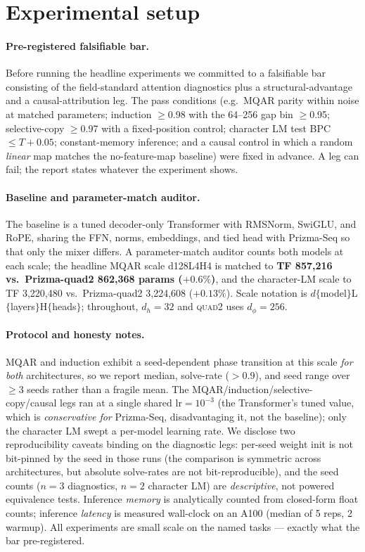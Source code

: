 \documentclass[11pt]{article}
\newcommand{\dphi}{d_{\phi}}
\newcommand{\dhd}{d_{h}}
\newcommand{\quadtwo}{\textsc{quad2}}
\begin{document}
\section{Experimental setup}
\label{sec:setup}

\paragraph{Pre-registered falsifiable bar.}
Before running the headline experiments we committed to a falsifiable bar consisting of the
field-standard attention diagnostics plus a structural-advantage and a causal-attribution leg. The
pass conditions (e.g.\ MQAR parity within noise at matched parameters; induction $\geq$0.98 with the
64--256 gap bin $\geq$0.95; selective-copy $\geq$0.97 with a fixed-position control; character LM
test BPC $\leq T+0.05$; constant-memory inference; and a causal control in which a random
\emph{linear} map matches the no-feature-map baseline) were fixed in advance. A leg can fail; the
report states whatever the experiment shows.

\paragraph{Baseline and parameter-match auditor.}
The baseline is a tuned decoder-only Transformer with RMSNorm, SwiGLU, and RoPE, sharing the FFN,
norms, embeddings, and tied head with Prizma-Seq so that only the mixer differs. A parameter-match
auditor counts both models at each scale; the headline MQAR scale d128L4H4 is matched to
\textbf{TF 857{,}216 vs.\ Prizma-quad2 862{,}368 params ($+0.6\%$)}, and the character-LM scale to
TF 3{,}220{,}480 vs.\ Prizma-quad2 3{,}224{,}608 ($+0.13\%$). Scale notation is
$d\{$model$\}$L$\{$layers$\}$H$\{$heads$\}$; throughout, $\dhd{=}32$ and \quadtwo{} uses $\dphi{=}256$.

\paragraph{Protocol and honesty notes.}
MQAR and induction exhibit a seed-dependent phase transition at this scale \emph{for both}
architectures, so we report median, solve-rate ($>$0.9), and seed range over $\geq$3 seeds rather
than a fragile mean. The MQAR/induction/selective-copy/causal legs ran at a single shared
$\text{lr}{=}10^{-3}$ (the Transformer's tuned value, which is \emph{conservative for} Prizma-Seq,
disadvantaging it, not the baseline); only the character LM swept a per-model learning rate. We
disclose two reproducibility caveats binding on the diagnostic legs: per-seed weight init is not
bit-pinned by the seed in those runs (the comparison is symmetric across architectures, but
absolute solve-rates are not bit-reproducible), and the seed counts ($n{=}3$ diagnostics,
$n{=}2$ character LM) are \emph{descriptive}, not powered equivalence tests. Inference \emph{memory}
is analytically counted from closed-form float counts; inference \emph{latency} is measured
wall-clock on an A100 (median of 5 reps, 2 warmup). All experiments are small scale on the named
tasks --- exactly what the bar pre-registered.
\end{document}

